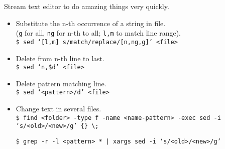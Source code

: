 Stream text editor to do amazing things very quickly.
\begin{itemize}[label={-}, leftmargin=*]
    \item Substitute the n-th occurrence of a string in file.\\ 
    ({\tt g} for all, {\tt ng} for n-th to all; {\tt l,m} to match line range).\\
    {\tt \$ sed `[l,m] s/match/replace/[n,ng,g]' <file>}
    
    \item Delete from n-th line to last.\\
    {\tt \$ sed `n,\$d' <file>}
    
    \item Delete pattern matching line.\\
    {\tt \$ sed `<pattern>/d' <file>}
    
    \item Change text in several files.\\
    {\tt \$ find <folder> -type f -name <name-pattern> -exec sed -i `s/<old>/<new>/g' \{\} \textbackslash;}
    
    {\tt \$ grep -r -l <pattern> * | xargs sed -i `s/<old>/<new>/g'}
    
    
\end{itemize}    
